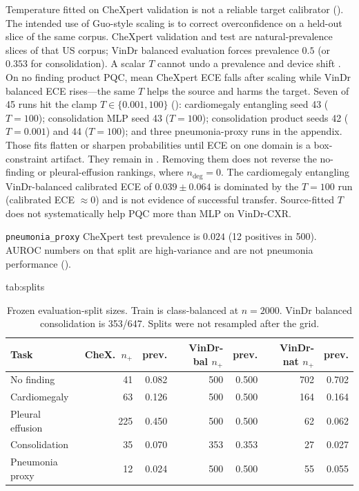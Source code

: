 \documentclass{midl} %
\begin{document}
Temperature fitted on CheXpert validation is not a reliable target calibrator (). The intended use of Guo-style scaling is to correct overconfidence on a held-out slice of the same corpus. CheXpert validation and test are natural-prevalence slices of that US corpus; VinDr balanced evaluation forces prevalence $0.5$ (or $0.353$ for consolidation). A scalar $T$ cannot undo a prevalence and device shift \cite{ovadia2019shift,guo2017calibration}. On no finding product PQC, mean CheXpert ECE falls after scaling while VinDr balanced ECE rises---the same $T$ helps the source and harms the target. Seven of 45 runs hit the clamp $T\in\{0.001,100\}$ (): cardiomegaly entangling seed 43 ($T=100$); consolidation MLP seed 43 ($T=100$); consolidation product seeds 42 ($T=0.001$) and 44 ($T=100$); and three pneumonia-proxy runs in the appendix. Those fits flatten or sharpen probabilities until ECE on one domain is a box-constraint artifact. They remain in . Removing them does not reverse the no-finding or pleural-effusion rankings, where $n_{\mathrm{deg}}=0$. The cardiomegaly entangling VinDr-balanced calibrated ECE of $0.039\pm0.064$ is dominated by the $T=100$ run (calibrated ECE $\approx 0$) and is not evidence of successful transfer. Source-fitted $T$ does not systematically help PQC more than MLP on VinDr-CXR.

\texttt{pneumonia\_proxy} CheXpert test prevalence is $0.024$ (12 positives in 500). AUROC numbers on that split are high-variance and are not pneumonia performance ().

\begin{table}[ht]
\floatconts
  {tab:splits}
  {\caption{Frozen evaluation-split sizes. Train is class-balanced at $n=2000$. VinDr balanced consolidation is 353/647. Splits were not resampled after the grid.}}
  {\small\begin{tabular}{lrrrrrr}
  \toprule
  Task & CheX.\ $n_+$ & prev. & VinDr-bal $n_+$ & prev. & VinDr-nat $n_+$ & prev. \\
  \midrule
  No finding & 41 & 0.082 & 500 & 0.500 & 702 & 0.702 \\
  Cardiomegaly & 63 & 0.126 & 500 & 0.500 & 164 & 0.164 \\
  Pleural effusion & 225 & 0.450 & 500 & 0.500 & 62 & 0.062 \\
  Consolidation & 35 & 0.070 & 353 & 0.353 & 27 & 0.027 \\
  Pneumonia proxy & 12 & 0.024 & 500 & 0.500 & 55 & 0.055 \\
  \bottomrule
  \end{tabular}}
\end{table}
\end{document}
